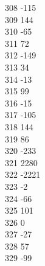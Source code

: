 { 308	-115 \\
 309	144 \\
 310	-65 \\
 311	72 \\
 312	-149 \\
 313	34 \\
 314	-13 \\
 315	99 \\
 316	-15 \\
 317	-105 \\
 318	144 \\
 319	86 \\
 320	-233 \\
 321	2280 \\
 322	-2221 \\
 323	-2 \\
 324	-66 \\
 325	101 \\
 326	0 \\
 327	-27 \\
 328	57 \\
 329	-99 \\
}
